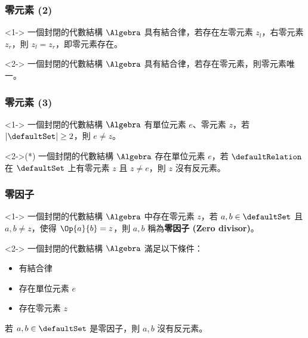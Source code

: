 \documentclass[utf8]{beamer}
\begin{document}
\begin{CJK}{UTF8}{bkai}
\begin{frame}
  \frametitle{零元素 (2)}
  \begin{mythm}[零元素存在性*]<1->
  \label{thm:algebra:zero_existence}
  一個封閉的代數結構 $\Algebra$ 具有結合律，若存在左零元素 $z_l$，右零元素 $z_r$，則 $z_l=z_r$，即零元素存在。
  \end{mythm}
  \begin{mythm}[零元素唯一性*]<2->
  \label{thm:algebra:zero_uniqueness}
  一個封閉的代數結構 $\Algebra$ 具有結合律，若存在零元素，則零元素唯一。
  \end{mythm}
\end{frame}

\begin{frame}
  \frametitle{零元素 (3)}
  \begin{mythm}<1->
  \label{thm:algebra:identity_zero_distinct}
  一個封閉的代數結構 $\Algebra$ 有單位元素 $e$、零元素 $z$，若 $|\defaultSet|\geq{2}$，則 $e\neq{z}$。
  \end{mythm}
  \begin{mypropo}<2->(*)
  \label{pro:algebra:zero_no_inverse}
  一個封閉的代數結構 $\Algebra$ 存在單位元素 $e$，若 $\defaultRelation$ 在 $\defaultSet$ 上有零元素 $z$ 且 $z\neq{e}$，則 $z$ 沒有反元素。
  \end{mypropo}
\end{frame}

\begin{frame}
  \frametitle{零因子}
  \begin{mydef}[零因子]<1->
  \label{def:algebra:zero_divisor}
  一個封閉的代數結構 $\Algebra$ 中存在零元素 $z$，若 $a,b\in{\defaultSet}$ 且 $a,b\neq{z}$，使得 $\Op{a}{b}=z$，則 $a,b$ 稱為\textbf{零因子 (Zero divisor)}。
  \end{mydef}
  \begin{mythm}[零因子性質]<2->
  \label{thm:algebra:zero_divisor_no_inverse}
  一個封閉的代數結構 $\Algebra$ 滿足以下條件：
  \begin{itemize}
  \item 有結合律
  \item 存在單位元素 $e$
  \item 存在零元素 $z$
  \end{itemize}
  若 $a,b\in{\defaultSet}$ 是零因子，則 $a,b$ 沒有反元素。
  \end{mythm}
\end{frame}


\end{CJK}
\end{document}
